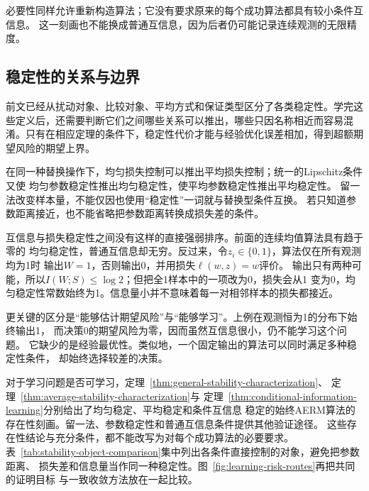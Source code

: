 必要性同样允许重新构造算法；它没有要求原来的每个成功算法都具有较小条件互信息。
这一刻画也不能换成普通互信息，因为后者仍可能记录连续观测的无限精度。

\subsection{稳定性的关系与边界}
\label{sec:stability-comparison}

前文已经从扰动对象、比较对象、平均方式和保证类型区分了各类稳定性。学完这些定义后，还需要判断它们之间哪些关系可以推出，哪些只因名称相近而容易混淆。只有在相应定理的条件下，稳定性代价才能与经验优化误差相加，得到超额期望风险的期望上界。

在同一种替换操作下，均匀损失控制可以推出平均损失控制；统一的Lipschitz条件又使
均匀参数稳定性推出均匀稳定性，使平均参数稳定性推出平均稳定性。
留一法改变样本量，不能仅因也使用“稳定性”一词就与替换型条件互换。
若只知道参数距离接近，也不能省略把参数距离转换成损失差的条件。

互信息与损失稳定性之间没有这样的直接强弱排序。前面的连续均值算法具有趋于零的
均匀稳定性，普通互信息却无穷。反过来，令$z_i\in\{0,1\}$，算法仅在所有观测均为1时
输出$W=1$，否则输出0，并用损失$\ell(w,z)=w$评价。
输出只有两种可能，所以$I(W;S)\leq\log2$；但把全1样本中的一项改为0，损失会从1
变为0，均匀稳定性常数始终为1。信息量小并不意味着每一对相邻样本的损失都接近。

更关键的区分是“能够估计期望风险”与“能够学习”。上例在观测恒为1的分布下始终输出1，
而决策0的期望风险为零，因而虽然互信息很小，仍不能学习这个问题。
它缺少的是经验最优性。类似地，一个固定输出的算法可以同时满足多种稳定性条件，
却始终选择较差的决策。

对于学习问题是否可学习，定理~\ref{thm:general-stability-characterization}、
定理~\ref{thm:average-stability-characterization}与
定理~\ref{thm:conditional-information-learning}分别给出了均匀稳定、平均稳定和条件互信息
稳定的始终AERM算法的存在性刻画。留一法、参数稳定性和普通互信息条件提供其他验证途径。
这些存在性结论与充分条件，都不能改写为对每个成功算法的必要要求。
表~\ref{tab:stability-object-comparison}集中列出各条件直接控制的对象，避免把参数距离、
损失差和信息量当作同一种稳定性。图~\ref{fig:learning-risk-routes}再把共同的证明目标
与一致收敛方法放在一起比较。

